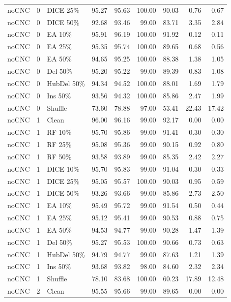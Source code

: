 {\begin{longtable}{rllrrrrrr}
noCNC & 0 & DICE 25\% & 95.27 & 95.63 & 100.00 & 90.03 & 0.76 & 0.67 \\
noCNC & 0 & DICE 50\% & 92.68 & 93.46 & 99.00 & 83.71 & 3.35 & 2.84 \\
noCNC & 0 & EA 10\% & 95.91 & 96.19 & 100.00 & 91.92 & 0.12 & 0.11 \\
noCNC & 0 & EA 25\% & 95.35 & 95.74 & 100.00 & 89.65 & 0.68 & 0.56 \\
noCNC & 0 & EA 50\% & 94.65 & 95.25 & 100.00 & 88.38 & 1.38 & 1.05 \\
noCNC & 0 & Del 50\% & 95.20 & 95.22 & 99.00 & 89.39 & 0.83 & 1.08 \\
noCNC & 0 & HubDel 50\% & 94.34 & 94.52 & 100.00 & 88.01 & 1.69 & 1.79 \\
noCNC & 0 & Ins 50\% & 93.56 & 94.32 & 100.00 & 85.86 & 2.47 & 1.99 \\
noCNC & 0 & Shuffle & 73.60 & 78.88 & 97.00 & 53.41 & 22.43 & 17.42 \\
noCNC & 1 & Clean & 96.00 & 96.16 & 99.00 & 92.17 & 0.00 & 0.00 \\
noCNC & 1 & RF 10\% & 95.70 & 95.86 & 99.00 & 91.41 & 0.30 & 0.30 \\
noCNC & 1 & RF 25\% & 95.08 & 95.36 & 99.00 & 90.15 & 0.92 & 0.80 \\
noCNC & 1 & RF 50\% & 93.58 & 93.89 & 99.00 & 85.35 & 2.42 & 2.27 \\
noCNC & 1 & DICE 10\% & 95.70 & 95.83 & 99.00 & 91.04 & 0.30 & 0.33 \\
noCNC & 1 & DICE 25\% & 95.05 & 95.57 & 100.00 & 90.03 & 0.95 & 0.59 \\
noCNC & 1 & DICE 50\% & 93.26 & 93.66 & 99.00 & 85.86 & 2.73 & 2.50 \\
noCNC & 1 & EA 10\% & 95.49 & 95.72 & 99.00 & 91.54 & 0.50 & 0.44 \\
noCNC & 1 & EA 25\% & 95.12 & 95.41 & 99.00 & 90.53 & 0.88 & 0.75 \\
noCNC & 1 & EA 50\% & 94.53 & 94.77 & 99.00 & 90.28 & 1.47 & 1.39 \\
noCNC & 1 & Del 50\% & 95.27 & 95.53 & 100.00 & 90.66 & 0.73 & 0.63 \\
noCNC & 1 & HubDel 50\% & 94.79 & 94.77 & 99.00 & 87.63 & 1.21 & 1.39 \\
noCNC & 1 & Ins 50\% & 93.68 & 93.82 & 98.00 & 84.60 & 2.32 & 2.34 \\
noCNC & 1 & Shuffle & 78.10 & 83.68 & 100.00 & 60.23 & 17.89 & 12.48 \\
noCNC & 2 & Clean & 95.55 & 95.66 & 99.00 & 89.65 & 0.00 & 0.00 \\

\end{longtable}}
